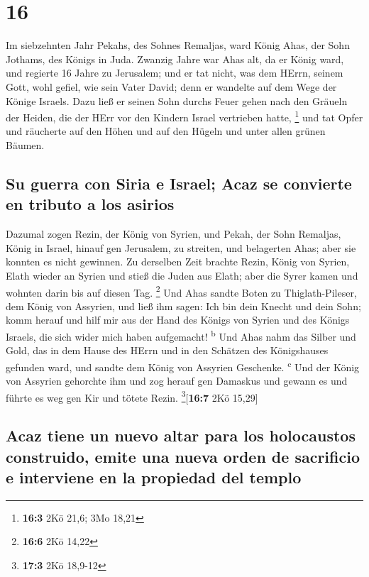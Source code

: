 \hypertarget{section-15}{%
\section{16}\label{section-15}}

 Im siebzehnten Jahr Pekahs, des Sohnes Remaljas, ward
König Ahas, der Sohn Jothams, des Königs in Juda.  Zwanzig
Jahre war Ahas alt, da er König ward, und regierte 16 Jahre zu
Jerusalem; und er tat nicht, was dem HErrn, seinem Gott, wohl gefiel,
wie sein Vater David;  denn er wandelte auf dem Wege der
Könige Israels. Dazu ließ er seinen Sohn durchs Feuer gehen nach den
Gräueln der Heiden, die der HErr vor den Kindern Israel vertrieben
hatte, \footnote{\textbf{16:3} 2Kö 21,6; 3Mo 18,21}  und
tat Opfer und räucherte auf den Höhen und auf den Hügeln und unter allen
grünen Bäumen.

\hypertarget{su-guerra-con-siria-e-israel-acaz-se-convierte-en-tributo-a-los-asirios}{%
\subsection{Su guerra con Siria e Israel; Acaz se convierte en tributo a
los
asirios}\label{su-guerra-con-siria-e-israel-acaz-se-convierte-en-tributo-a-los-asirios}}

 Dazumal zogen Rezin, der König von Syrien, und Pekah, der
Sohn Remaljas, König in Israel, hinauf gen Jerusalem, zu streiten, und
belagerten Ahas; aber sie konnten es nicht gewinnen.  Zu
derselben Zeit brachte Rezin, König von Syrien, Elath wieder an Syrien
und stieß die Juden aus Elath; aber die Syrer kamen und wohnten darin
bis auf diesen Tag. \footnote{\textbf{16:6} 2Kö 14,22} 
Und Ahas sandte Boten zu Thiglath-Pileser, dem König von Assyrien, und
ließ ihm sagen: Ich bin dein Knecht und dein Sohn; komm herauf und hilf
mir aus der Hand des Königs von Syrien und des Königs Israels, die sich
wider mich haben aufgemacht! \textsuperscript{b}  Und Ahas
nahm das Silber und Gold, das in dem Hause des HErrn und in den Schätzen
des Königshauses gefunden ward, und sandte dem König von Assyrien
Geschenke. \textsuperscript{c}  Und der König von Assyrien
gehorchte ihm und zog herauf gen Damaskus und gewann es und führte es
weg gen Kir und tötete Rezin. \footnote{\textbf{17:3} 2Kö 18,9-12}{[}\textbf{16:7}
2Kö 15,29{]}

\hypertarget{acaz-tiene-un-nuevo-altar-para-los-holocaustos-construido-emite-una-nueva-orden-de-sacrificio-e-interviene-en-la-propiedad-del-templo}{%
\subsection{Acaz tiene un nuevo altar para los holocaustos construido,
emite una nueva orden de sacrificio e interviene en la propiedad del
templo}\label{acaz-tiene-un-nuevo-altar-para-los-holocaustos-construido-emite-una-nueva-orden-de-sacrificio-e-interviene-en-la-propiedad-del-templo}}

